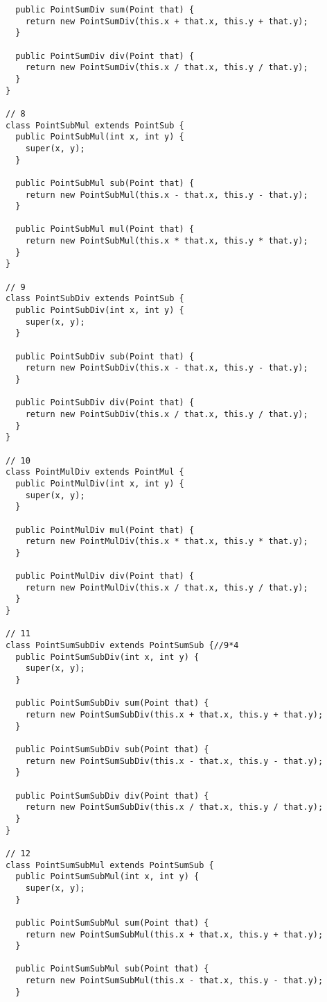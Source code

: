 \begin{lstlisting}
  public PointSumDiv sum(Point that) {
    return new PointSumDiv(this.x + that.x, this.y + that.y);
  }

  public PointSumDiv div(Point that) {
    return new PointSumDiv(this.x / that.x, this.y / that.y);
  }
}

// 8
class PointSubMul extends PointSub {
  public PointSubMul(int x, int y) {
    super(x, y);
  }

  public PointSubMul sub(Point that) {
    return new PointSubMul(this.x - that.x, this.y - that.y);
  }

  public PointSubMul mul(Point that) {
    return new PointSubMul(this.x * that.x, this.y * that.y);
  }
}

// 9
class PointSubDiv extends PointSub {
  public PointSubDiv(int x, int y) {
    super(x, y);
  }

  public PointSubDiv sub(Point that) {
    return new PointSubDiv(this.x - that.x, this.y - that.y);
  }

  public PointSubDiv div(Point that) {
    return new PointSubDiv(this.x / that.x, this.y / that.y);
  }
}

// 10
class PointMulDiv extends PointMul {
  public PointMulDiv(int x, int y) {
    super(x, y);
  }

  public PointMulDiv mul(Point that) {
    return new PointMulDiv(this.x * that.x, this.y * that.y);
  }

  public PointMulDiv div(Point that) {
    return new PointMulDiv(this.x / that.x, this.y / that.y);
  }
}

// 11
class PointSumSubDiv extends PointSumSub {//9*4
  public PointSumSubDiv(int x, int y) {
    super(x, y);
  }

  public PointSumSubDiv sum(Point that) {
    return new PointSumSubDiv(this.x + that.x, this.y + that.y);
  }

  public PointSumSubDiv sub(Point that) {
    return new PointSumSubDiv(this.x - that.x, this.y - that.y);
  }

  public PointSumSubDiv div(Point that) {
    return new PointSumSubDiv(this.x / that.x, this.y / that.y);
  }
}

// 12
class PointSumSubMul extends PointSumSub {
  public PointSumSubMul(int x, int y) {
    super(x, y);
  }

  public PointSumSubMul sum(Point that) {
    return new PointSumSubMul(this.x + that.x, this.y + that.y);
  }

  public PointSumSubMul sub(Point that) {
    return new PointSumSubMul(this.x - that.x, this.y - that.y);
  }


\end{lstlisting}
